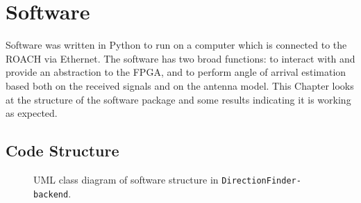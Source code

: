 \chapter{Software}
\label{ch:software-design}
\graphicspath{{./img/software/}}
Software was written in Python to run on a computer which is connected to the ROACH via Ethernet. The software has two broad functions: to interact with and provide an abstraction to the FPGA, and to perform angle of arrival estimation based both on the received signals and on the antenna model. This Chapter looks at the structure of the software package and some results indicating it is working as expected.

\section{Code Structure}
\begin{figure}
  \centering
  \caption{UML class diagram of software structure in \lstinline{DirectionFinder-backend}.}
  \label{fig:software:df-backend-uml}
\end{figure}
